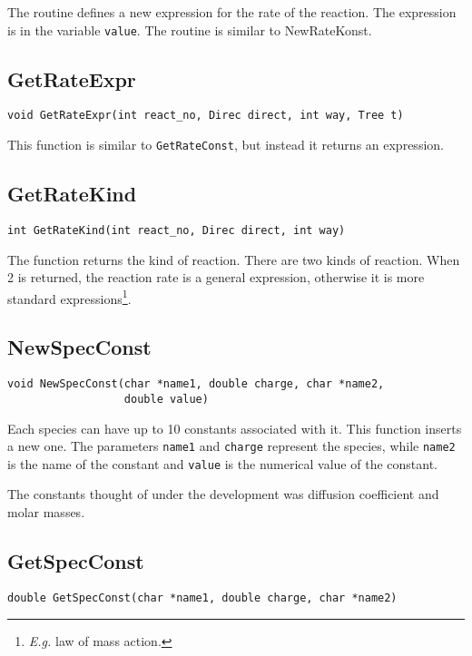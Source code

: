 The routine defines a new expression for the rate of the reaction. 
The expression is in the variable {\tt value}. The routine is 
similar to NewRateKonst.

\subsection{GetRateExpr}
\begin{verbatim}
void GetRateExpr(int react_no, Direc direct, int way, Tree t)
\end{verbatim}

This function is similar to {\tt GetRateConst}, but instead it returns
an expression.

\subsection{GetRateKind}
\begin{verbatim}
int GetRateKind(int react_no, Direc direct, int way)
\end{verbatim}

The function returns the kind of reaction. There are two kinds of 
reaction. When 2 is returned, the reaction rate is a general
expression, otherwise it is more standard
expressions\footnote{{\em E.g.\/} law of mass action.}.

\subsection{NewSpecConst}
\label{tableman:NewSpecConst}
\begin{verbatim}
void NewSpecConst(char *name1, double charge, char *name2, 
                  double value)
\end{verbatim}

Each species can have up to 10 constants associated with it. This function 
inserts a new one. The parameters {\tt name1} and {\tt charge} represent the
species, while {\tt name2} is the name of the constant and {\tt value} is
the numerical value of the constant.

The constants thought of under the development was diffusion
coefficient and molar masses.

\subsection{GetSpecConst}
\begin{verbatim}
double GetSpecConst(char *name1, double charge, char *name2)
\end{verbatim}

